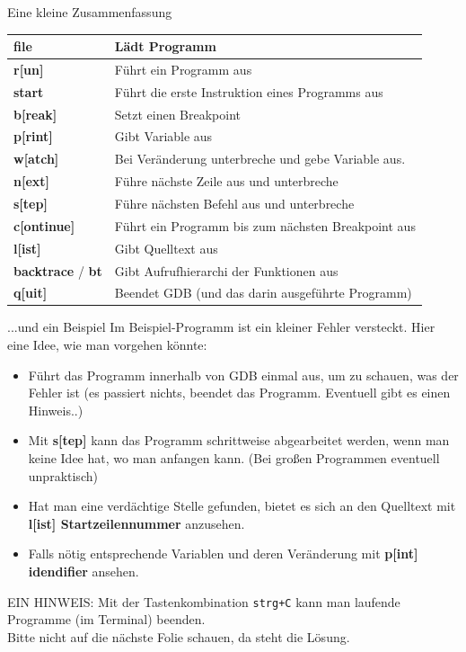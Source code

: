 
\begin{frame}{Eine kleine Zusammenfassung}
		\begin{tabular}{|l|l|}
			\hline
			\textbf{file} & L\"adt Programm\\
			\hline
			\textbf{r[un]} & F\"uhrt ein Programm aus\\
			\hline
			\textbf{start} & Führt die erste Instruktion eines Programms aus\\\hline
			\textbf{b[reak]} & Setzt einen Breakpoint\\\hline
			\textbf{p[rint]} & Gibt Variable aus\\
			\hline
			\textbf{w[atch]} & Bei Ver\"anderung unterbreche und gebe Variable aus.\\
			\hline
			\textbf{n[ext]} & F\"uhre n\"achste Zeile aus und unterbreche\\
			\hline
			\textbf{s[tep]} & F\"uhre n\"achsten Befehl aus und unterbreche\\\hline
			\textbf{c[ontinue]} & F\"uhrt ein Programm bis zum n\"achsten Breakpoint aus\\
			\hline
			\textbf{l[ist]} & Gibt Quelltext aus\\
			\hline
			\textbf{backtrace} / \textbf{bt} & Gibt Aufrufhierarchi der Funktionen aus\\
			\hline
			\textbf{q[uit]}  & Beendet GDB (und das darin ausgeführte Programm)\\\hline
		\end{tabular}	
\end{frame}
\begin{frame}{...und ein Beispiel}
Im Beispiel-Programm ist ein kleiner Fehler versteckt. Hier eine Idee, wie man vorgehen könnte:
\begin{itemize}
    \item F\"uhrt das Programm innerhalb von GDB einmal aus, um zu schauen, was der Fehler ist (es passiert nichts, beendet das Programm. Eventuell gibt es einen Hinweis..)
    \item Mit \textbf{s[tep]} kann das Programm schrittweise abgearbeitet werden, wenn man keine Idee hat, wo man anfangen kann. (Bei großen Programmen eventuell unpraktisch)
    \item Hat man eine verdächtige Stelle gefunden, bietet es sich an den Quelltext mit \textbf{l[ist] Startzeilennummer} anzusehen.
    \item Falls nötig entsprechende Variablen und deren Ver\"anderung mit \textbf{p[int] idendifier} ansehen. 
\end{itemize}
EIN HINWEIS: Mit der Tastenkombination \texttt{strg+C} kann man laufende Programme (im Terminal) beenden. \\
Bitte nicht auf die n\"achste Folie schauen, da steht die Lösung.
\end{frame}

